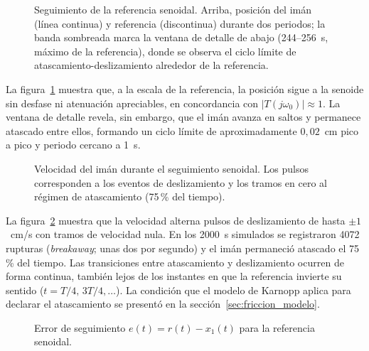 \begin{figure}[ht]
    \centering
    
    \caption[Seguimiento senoidal: posición]{Seguimiento de la referencia senoidal. Arriba, posición del imán (línea continua) y referencia (discontinua) durante dos periodos; la banda sombreada marca la ventana de detalle de abajo (244--256~s, máximo de la referencia), donde se observa el ciclo límite de atascamiento-deslizamiento alrededor de la referencia.}
    \label{fig:sen_pos}
\end{figure}

La figura~\ref{fig:sen_pos} muestra que, a la escala de la referencia, la posición sigue a la senoide sin desfase ni atenuación apreciables, en concordancia con $|T(j\omega_0)|\approx 1$. La ventana de detalle revela, sin embargo, que el imán avanza en saltos y permanece atascado entre ellos, formando un ciclo límite de aproximadamente $0{,}02$~cm pico a pico y periodo cercano a 1~s.

\FloatBarrier

\begin{figure}[ht]
    \centering
    
    \caption[Seguimiento senoidal: velocidad]{Velocidad del imán durante el seguimiento senoidal. Los pulsos corresponden a los eventos de deslizamiento y los tramos en cero al régimen de atascamiento (75\,\% del tiempo).}
    \label{fig:sen_vel}
\end{figure}

La figura~\ref{fig:sen_vel} muestra que la velocidad alterna pulsos de deslizamiento de hasta $\pm 1$~cm/s con tramos de velocidad nula. En los 2000~s simulados se registraron 4072 rupturas (\emph{breakaway}; unas dos por segundo) y el imán permaneció atascado el 75\,\% del tiempo. Las transiciones entre atascamiento y deslizamiento ocurren de forma continua, también lejos de los instantes en que la referencia invierte su sentido ($t = T/4,\,3T/4,\ldots$). La condición que el modelo de Karnopp aplica para declarar el atascamiento se presentó en la sección~\ref{sec:friccion_modelo}.

\FloatBarrier

\begin{figure}[ht]
    \centering
    
    \caption[Seguimiento senoidal: error]{Error de seguimiento $e(t)=r(t)-x_1(t)$ para la referencia senoidal.}
    \label{fig:sen_error}
\end{figure}

